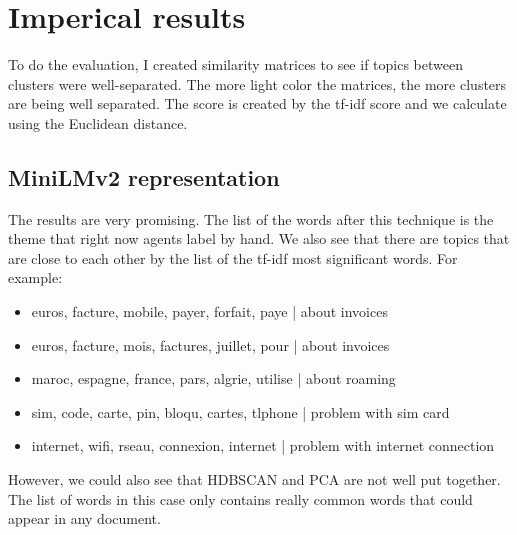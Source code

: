 \chapter{Imperical results}

\startcontents[chapters]
\printmyminitoc{
}

To do the evaluation, I created similarity matrices to see if topics between clusters were well-separated. The more light color the matrices, the more clusters are being well separated. The score is created by the tf-idf score and we calculate using the Euclidean distance.


\section{MiniLMv2 representation}

The results are very promising. The list of the words after this technique is the theme that right now agents label by hand. We also see that there are topics that are close to each other by the list of the tf-idf most significant words. For example:

\begin{itemize}
    \item euros, facture, mobile, payer, forfait, paye |  about invoices
    \item euros, facture, mois, factures, juillet, pour |  about invoices
    \item maroc, espagne, france, pars, algrie, utilise |  about roaming
    \item sim, code, carte, pin, bloqu, cartes, tlphone | problem with sim card
    \item internet, wifi, rseau, connexion, internet | problem with internet connection
\end{itemize}

However, we could also see that HDBSCAN and PCA are not well put together. The list of words in this case only contains really common words that could appear in any document.

